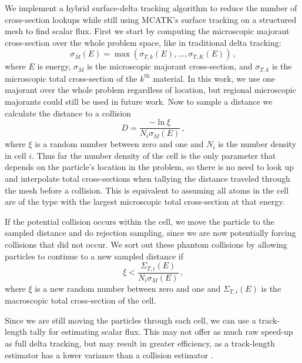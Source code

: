 We implement a hybrid surface-delta tracking algorithm to reduce the number of cross-section lookups while still using MCATK's surface tracking on a structured mesh to find scalar flux. First we start by computing the microscopic majorant cross-section over the whole problem space, like in traditional delta tracking:
\begin{equation}
    \label{eq:majorant}
    \sigma_{M}(E) = \max\left(\sigma_{T,k}(E), ..., \sigma_{T,K}(E)\right) \,\text{,}
\end{equation}
where $E$ is energy, $\sigma_{M}$ is the microscopic majorant cross-section, and $\sigma_{T,k}$ is the microscopic total cross-section of the $k^{\text{th}}$ material. In this work, we use one majorant over the whole problem regardless of location, but regional microscopic majorants could still be used in future work. Now to sample a distance we calculate the distance to a collision
\begin{equation}
    \label{eq:sample}
    D = \frac{-\ln{\xi}}{N_i \sigma_{M}(E)} \, \text{,} 
\end{equation}
where $\xi$ is a random number between zero and one and $N_i$ is the number density in cell $i$.
Thus far the number density of the cell is the only parameter that depends on the particle's location in the problem, so there is no need to look up and interpolate total cross-sections when tallying the distance traveled through the mesh before a collision.
This is equivalent to assuming all atoms in the cell are of the type with the largest microscopic total cross-section at that energy.

If the potential collision occurs within the cell, we move the particle to the sampled distance and do rejection sampling, since we are now potentially forcing collisions that did not occur. We sort out these phantom collisions by allowing particles to continue to a new sampled distance if
\begin{equation}
    \label{eq:reject}
    \xi < \frac{ \Sigma_{T,i}(E) } { N_i \sigma_M(E) } \, \text{,}
\end{equation}
where $\xi$ is a new random number between zero and one and $\Sigma_{T,i}(E)$ is the macroscopic total cross-section of the cell. 

Since we are still moving the particles through each cell, we can use a track-length tally for estimating scalar flux.
This may not offer as much raw speed-up as full delta tracking, but may result in greater efficiency, as a track-length estimator has a lower variance than a collision estimator \cite{mc2018}.


